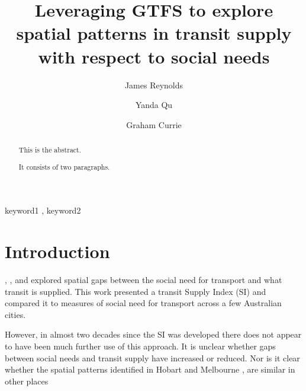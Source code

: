 \documentclass[preprint, 3p,
authoryear]{elsarticle} %
\begin{document}
\begin{frontmatter}

  \title{Leveraging GTFS to explore spatial patterns in transit supply
with respect to social needs}
    \author[Public Transport Research Group (PTRG)]{James Reynolds%
  }
    \author[Public Transport Research Group (PTRG)]{Yanda Qu%
  }
    \author[Public Transport Research Group (PTRG)]{Graham Currie%
  }
  
  \begin{abstract}
  This is the abstract.

  It consists of two paragraphs.
  \end{abstract}
    \begin{keyword}
    keyword1 \sep 
    keyword2
  \end{keyword}
  
 \end{frontmatter}

\hypertarget{introduction}{%
\section{Introduction}\label{introduction}}

\citet{Currie2003Hobart}, \citet{Currie2004Gap},
\citet{Currie2007Identifying} and \citet{currie2010identifying} explored
spatial gaps between the social need for transport and what transit is
supplied. This work presented a transit Supply Index (SI) and compared
it to measures of social need for transport across a few Australian
cities.

However, in almost two decades since the SI was developed there does not
appear to have been much further use of this approach. It is unclear
whether gaps between social needs and transit supply have increased or
reduced. Nor is it clear whether the spatial patterns identified in
Hobart \citep{Currie2003Hobart, Currie2004Gap} and Melbourne
\citep{Currie2007Identifying, currie2010identifying}, are similar in
other places
\end{document}
